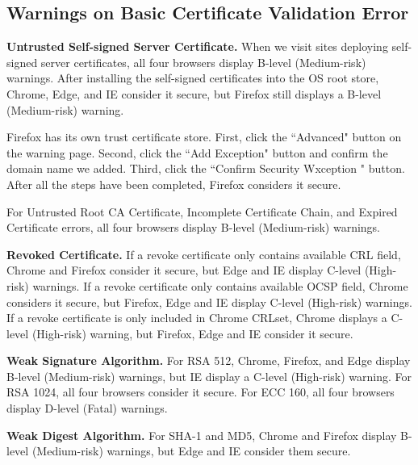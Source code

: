 \subsection{Warnings on Basic Certificate Validation Error}

\textbf{Untrusted Self-signed Server Certificate.}
    When we visit sites deploying self-signed server certificates, all four browsers display B-level (Medium-risk) warnings.
    After installing the self-signed certificates into the OS root store, Chrome, Edge, and IE consider it secure, but Firefox still displays a B-level (Medium-risk) warning.

   Firefox has its own trust certificate store.
   First, click the ``Advanced" button on the warning page.
   Second, click the ``Add Exception" button and confirm the domain name we added.
   Third, click the ``Confirm Security Wxception " button.
   After all the steps have been completed, Firefox considers it secure.


    For Untrusted Root CA Certificate, Incomplete Certificate Chain, and Expired Certificate errors,
        all four browsers display B-level (Medium-risk) warnings.

\textbf{Revoked Certificate.}
    If a revoke certificate only contains available CRL field,
        Chrome and Firefox consider it secure,
            but Edge and IE display C-level (High-risk) warnings.
    If a revoke certificate only contains available OCSP field,
        Chrome considers it secure, but Firefox,
            Edge and IE display C-level (High-risk) warnings.
    If a revoke certificate is only included in Chrome CRLset,
        Chrome displays a C-level (High-risk) warning,
            but Firefox, Edge and IE consider it secure.

\textbf{Weak Signature Algorithm.}
    For RSA 512,
        Chrome, Firefox, and Edge display B-level (Medium-risk) warnings,
            but IE display a C-level (High-risk) warning.
    For RSA 1024,
        all four browsers consider it secure.
    For ECC 160,
        all four browsers display D-level (Fatal) warnings.

\textbf{Weak Digest Algorithm.}
    For SHA-1 and MD5,
        Chrome and Firefox display B-level (Medium-risk) warnings,
            but Edge and IE consider them secure.

